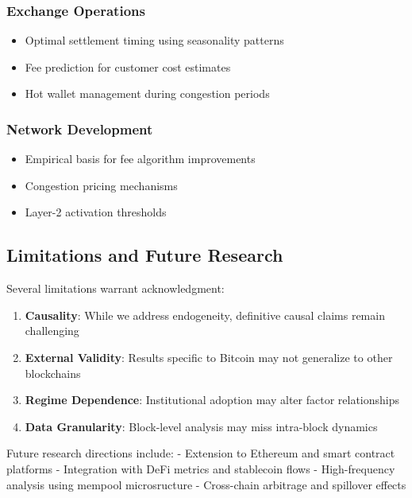 \documentclass[
  12pt,
  letterpaper,
  DIV=11,
  numbers=noendperiod]{scrartcl}
\providecommand{\tightlist}{%
  \setlength{\itemsep}{0pt}\setlength{\parskip}{0pt}}
\begin{document}
\subsubsection{Exchange Operations}\label{exchange-operations}

\begin{itemize}
\tightlist
\item
  Optimal settlement timing using seasonality patterns
\item
  Fee prediction for customer cost estimates
\item
  Hot wallet management during congestion periods
\end{itemize}

\subsubsection{Network Development}\label{network-development}

\begin{itemize}
\tightlist
\item
  Empirical basis for fee algorithm improvements
\item
  Congestion pricing mechanisms
\item
  Layer-2 activation thresholds
\end{itemize}

\subsection{Limitations and Future
Research}\label{limitations-and-future-research}

Several limitations warrant acknowledgment:

\begin{enumerate}
\def\labelenumi{\arabic{enumi}.}
\tightlist
\item
  \textbf{Causality}: While we address endogeneity, definitive causal
  claims remain challenging
\item
  \textbf{External Validity}: Results specific to Bitcoin may not
  generalize to other blockchains
\item
  \textbf{Regime Dependence}: Institutional adoption may alter factor
  relationships
\item
  \textbf{Data Granularity}: Block-level analysis may miss intra-block
  dynamics
\end{enumerate}

Future research directions include: - Extension to Ethereum and smart
contract platforms - Integration with DeFi metrics and stablecoin flows
- High-frequency analysis using mempool microsructure - Cross-chain
arbitrage and spillover effects
\end{document}
